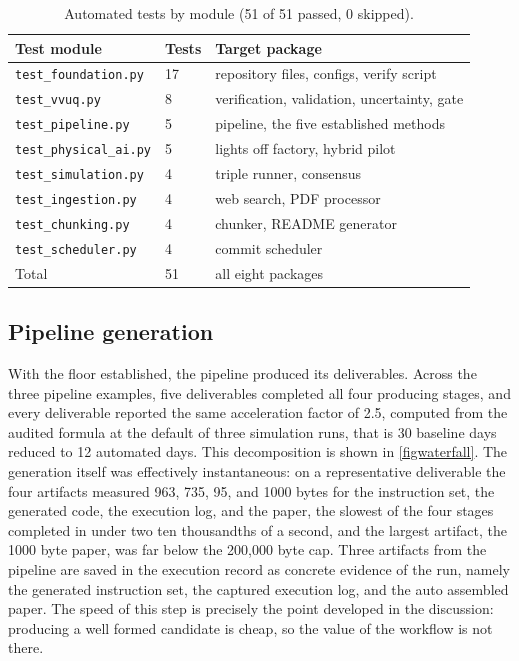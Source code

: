 \begin{table}[H]
\caption{Automated tests by module (51 of 51 passed, 0 skipped).}
\label{tab:results_tests}
\centering
\begin{tabularx}{\textwidth}{L{4.2cm} C{1.8cm} >{\raggedright\arraybackslash}X}
\toprule
\textbf{Test module} & \textbf{Tests} & \textbf{Target package} \\
\midrule
  \texttt{test\_foundation.py}   & 17 & repository files, configs, verify script \\
  \texttt{test\_vvuq.py}         & 8  & verification, validation, uncertainty, gate \\
  \texttt{test\_pipeline.py}     & 5  & pipeline, the five established methods \\
  \texttt{test\_physical\_ai.py} & 5  & lights off factory, hybrid pilot \\
  \texttt{test\_simulation.py}   & 4  & triple runner, consensus \\
  \texttt{test\_ingestion.py}    & 4  & web search, PDF processor \\
  \texttt{test\_chunking.py}     & 4  & chunker, README generator \\
  \texttt{test\_scheduler.py}    & 4  & commit scheduler \\
  \midrule
  Total                          & 51 & all eight packages \\
\bottomrule
\end{tabularx}
\end{table}


\subsection{Pipeline generation}

With the floor established, the pipeline produced its deliverables. Across the
three pipeline examples, five deliverables completed all four producing stages,
and every deliverable reported the same acceleration factor of 2.5, computed from
the audited formula at the default of three simulation runs, that is 30 baseline
days reduced to 12 automated days. This decomposition is shown in
\autoref{figwaterfall}. The generation itself was effectively instantaneous: on a representative
deliverable the four artifacts measured 963, 735, 95, and 1000 bytes for the
instruction set, the generated code, the execution log, and the paper, the
slowest of the four stages completed in under two ten thousandths of a second,
and the largest artifact, the 1000 byte paper, was far below the 200{,}000 byte
cap. Three artifacts from the pipeline are
saved in the execution record as concrete evidence of the run, namely the
generated instruction set, the captured execution log, and the auto assembled
paper. The speed of this step is precisely the point developed in the discussion:
producing a well formed candidate is cheap, so the value of the workflow is not there.

